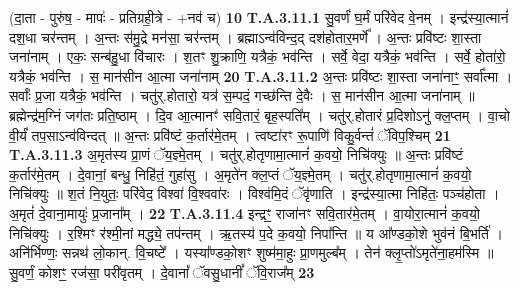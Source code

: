 \documentclass[17pt]{extarticle}
\begin{document}
                  \newline
                                                        (दा॒ता - पुरु॑ष॒ - मापः॑ - प्रतिग्रही॒त्रे - +नव॑ च) \textbf{10} \newline \newline
                                \textbf{ T.A.3.11.1} \newline
                  सु॒वर्णं॑ घ॒र्मं परि॑वेद वे॒नम् । इन्द्र॑स्या॒त्मानं॑ दश॒धा चर॑न्तम् ।  अ॒न्तः स॑मु॒द्रे मन॑सा॒ चर॑न्तम् । ब्रह्माऽन्व॑विन्द॒द् दश॑होतार॒मर्णे᳚ ।  अ॒न्तः प्रवि॑ष्टः शा॒स्ता जना॑नाम् । एकः॒ सन्ब॑हु॒धा वि॑चारः । श॒तꣳ शु॒क्राणि॒ यत्रैकं॒ भव॑न्ति । सर्वे॒ वेदा॒ यत्रैकं॒ भव॑न्ति । सर्वे॒ होता॑रो॒ यत्रैकं॒ भव॑न्ति । स॒ मान॑सीन आ॒त्मा जना॑नाम् \textbf{ 20} \newline
                  \newline
                                                                  \textbf{ T.A.3.11.2} \newline
                  अ॒न्तः प्रवि॑ष्टः शा॒स्ता जना॑नाꣳ॒॒ सर्वा᳚त्मा ।  सर्वाः᳚ प्र॒जा यत्रैकं॒ भव॑न्ति । चतु॑र्.होतारो॒ यत्र॑ स॒म्पदं॒ गच्छ॑न्ति दे॒वैः । स॒ मान॑सीन आ॒त्मा जना॑नाम् ॥ ब्रह्मेन्द्र॑म॒ग्निं जग॑तः प्रति॒ष्ठाम् ।  दि॒व आ॒त्मानꣳ॑ सवि॒तारं॒ बृह॒स्पति᳚म् ।  चतु॑र्.होतारं प्र॒दिशोऽनु॑ क्ल॒प्तम् । वा॒चो वी॒र्यं॑ तप॒साऽन्व॑विन्दत् ॥ अ॒न्तः प्रवि॑ष्टं क॒र्तार॑मे॒तम् ।  त्वष्टा॑रꣳ रू॒पाणि॑ विकु॒र्वन्तं॑ ॅविप॒श्चिम् \textbf{ 21} \newline
                  \newline
                                                                  \textbf{ T.A.3.11.3} \newline
                  अ॒मृत॑स्य प्रा॒णं ॅय॒ज्ञ्मे॒तम् ।  चतु॑र्.होतृणामा॒त्मानं॑ क॒वयो॒ निचि॑क्युः ॥  अ॒न्तः प्रवि॑ष्टं क॒र्तार॑मे॒तम् ।  दे॒वानां॒ बन्धु॒ निहि॑तं॒ गुहा॑सु ।  अ॒मृते॑न क्ल॒प्तं ॅय॒ज्ञ्मे॒तम् ।  चतु॑र्.होतृणामा॒त्मानं॑ क॒वयो॒ निचि॑क्युः ॥  श॒तं नि॒युतः॒ परि॑वेद॒ विश्वा॑ वि॒श्ववा॑रः । विश्व॑मि॒दं ॅवृ॑णाति ।  इन्द्र॑स्या॒त्मा निहि॑तः॒ पञ्च॑होता ।  अ॒मृतं॑ दे॒वाना॒मायुः॑ प्र॒जाना᳚म् । \textbf{ 22} \newline
                  \newline
                                                                  \textbf{ T.A.3.11.4} \newline
                  इन्द्रꣳ॒॒ राजा॑नꣳ सवि॒तार॑मे॒तम् । वा॒योरा॒त्मानं॑ क॒वयो॒ निचि॑क्युः ।  र॒श्मिꣳ र॑श्मी॒नां मद्ध्ये॒ तप॑न्तम् । ऋ॒तस्य॑ प॒दे क॒वयो॒ निपा᳚न्ति ॥ य आ᳚ण्डको॒शे भुव॑नं बि॒भर्ति॑ । अनि॑र्भिण्णः॒ सन्नथ॑ लो॒कान्. वि॒चष्टे᳚ ।  यस्या᳚ण्डको॒शꣳ शुष्म॑मा॒हुः प्रा॒णमुल्ब᳚म् ।  तेन॑ क्लृ॒प्तो॑ऽमृते॑ना॒हम॑स्मि ॥ सु॒वर्णं॒ कोशꣳ॒॒ रज॑सा॒ परी॑वृतम् ।  दे॒वानां᳚ ॅवसु॒धानीं᳚ ॅवि॒राज᳚म् \textbf{ 23} \newline
\end{document}
